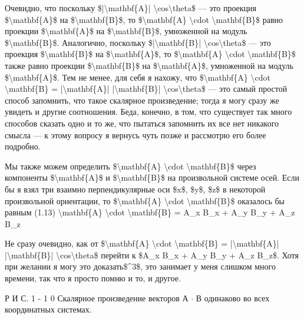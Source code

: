 \documentclass[10pt,oneside]{article}
\begin{document}
Очевидно, что поскольку \$|\textbackslash{}mathbf\{A\}| \textbackslash{}cos\textbackslash{}theta\$ --- это проекция \$\textbackslash{}mathbf\{A\}\$ на \$\textbackslash{}mathbf\{B\}\$, то \$\textbackslash{}mathbf\{A\} \textbackslash{}cdot \textbackslash{}mathbf\{B\}\$ равно проекции \$\textbackslash{}mathbf\{A\}\$ на \$\textbackslash{}mathbf\{B\}\$, умноженной на модуль \$\textbackslash{}mathbf\{B\}\$. Аналогично, поскольку \$|\textbackslash{}mathbf\{B\}| \textbackslash{}cos\textbackslash{}theta\$ --- это проекция \$\textbackslash{}mathbf\{B\}\$ на \$\textbackslash{}mathbf\{A\}\$, то \$\textbackslash{}mathbf\{A\} \textbackslash{}cdot \textbackslash{}mathbf\{B\}\$ также равно проекции \$\textbackslash{}mathbf\{B\}\$ на \$\textbackslash{}mathbf\{A\}\$, умноженной на модуль \$\textbackslash{}mathbf\{A\}\$. Тем не менее, для себя я нахожу, что \$\textbackslash{}mathbf\{A\} \textbackslash{}cdot \textbackslash{}mathbf\{B\} = |\textbackslash{}mathbf\{A\}| |\textbackslash{}mathbf\{B\}| \textbackslash{}cos\textbackslash{}theta\$ --- это самый простой способ запомнить, что такое скалярное произведение; тогда я могу сразу же увидеть и другие соотношения. Беда, конечно, в том, что существует так много способов сказать одно и то же, что пытаться запомнить их все нет никакого смысла --- к этому вопросу я вернусь чуть позже и рассмотрю его более подробно.\par

Мы также можем определить \$\textbackslash{}mathbf\{A\} \textbackslash{}cdot \textbackslash{}mathbf\{B\}\$ через компоненты \$\textbackslash{}mathbf\{A\}\$ и \$\textbackslash{}mathbf\{B\}\$ на произвольной системе осей. Если бы я взял три взаимно перпендикулярные оси \$x\$, \$y\$, \$z\$ в некоторой произвольной ориентации, то \$\textbackslash{}mathbf\{A\} \textbackslash{}cdot \textbackslash{}mathbf\{B\}\$ оказалось бы равным (1.13) \textbackslash{}mathbf\{A\} \textbackslash{}cdot \textbackslash{}mathbf\{B\} = A\_x B\_x + A\_y B\_y + A\_z B\_z\par

Не сразу очевидно, как от \$\textbackslash{}mathbf\{A\} \textbackslash{}cdot \textbackslash{}mathbf\{B\} = |\textbackslash{}mathbf\{A\}| |\textbackslash{}mathbf\{B\}| \textbackslash{}cos\textbackslash{}theta\$ перейти к \$A\_x B\_x + A\_y B\_y + A\_z B\_z\$. Хотя при желании я могу это доказать\$\textasciicircum{}3\$, это занимает у меня слишком много времени, так что я просто помню и то, и другое.\par

Р И С. 1 - 1 0 Скалярное произведение векторов А \ensuremath{\cdot} В одинаково во всех координатных системах.\par
\end{document}

